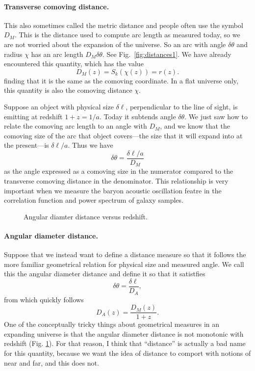 \paragraph{Transverse comoving distance.}  This also sometimes called the metric distance and people often use the symbol $D_M$.  This is the distance used to compute arc length as measured today, so we are not worried about the expansion of the universe.  So an arc with angle $\delta\theta$ and radius $\chi$ has an arc length $D_M \delta\theta$.  See Fig.~\ref{fig:distances1}.  We have already encountered this quantity, which has the value
\begin{equation}
  D_M(z) = S_k(\chi(z)) = r(z).
\end{equation}
finding that it is the same as the comoving coordinate.  In a flat universe only, this quantity is also the comoving distance $\chi$.

Suppose an object with physical size $\delta\ell$, perpendicular to the line of sight, is emitting at redshift $1+z = 1/a$.  Today it  subtends angle $\delta\theta$.
We just saw how to relate the comoving arc length to an angle with $D_M$, and we know that the comoving size of the arc that object covers---the size that it will expand into at the present---is $\delta\ell/a$.  Thus we have
\begin{equation}
 \delta\theta =  \frac{\delta\ell/a}{D_M} 
\end{equation}
as the angle expressed as a comoving size in the numerator compared to the transverse comoving distance in the denominator.  This relationship is very important when we measure the baryon acoustic oscillation featre in the correlation function and power spectrum of galaxy samples.

\begin{figure}
  \caption{Angular diamter distance versus redshift.}
  \label{fig:angular_diameter_distance}
\end{figure}

\paragraph{Angular diameter distance.}    Suppose that we instead want to define a distance measure so that it follows the more familiar geometrical relation for physical size and measured angle.  We call this the angular diameter distance and define it so that it satistfies
\begin{equation}
  \delta\theta = \frac{\delta\ell}{D_A},
\end{equation}
from which quickly follows
\begin{equation}
  D_A(z) = \frac{D_M(z)}{1+z}.
\end{equation}
One of the conceptually tricky things about geometrical measures in an expanding universe is that the angular diameter distance is not monotonic with redshift (Fig. \ref{fig:angular_diameter_distance}).  For that reason, I think that ``distance'' is actually a bad name for this quantity, because we want the idea of distance to comport with notions of near and far, and this does not.

